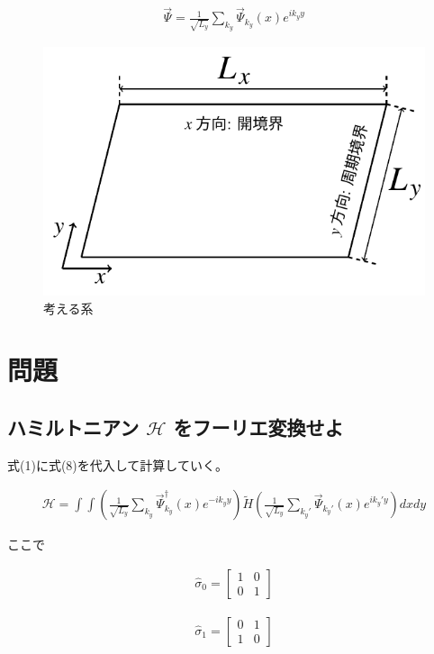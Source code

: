 \documentclass{jsarticle}
\begin{document}
		\begin{align}
			\vec{\Psi}=\frac{1}{\sqrt{L_y}}\sum_{k_y} \vec{\Psi}_{k_y}(x) e^{ik_yy}
		\end{align}

		\begin{figure}[H]
			\centering
			\includegraphics[scale=1]{figure1}
			\caption{考える系}
			\label{system}
		\end{figure}

	\section{問題}
		\subsection{ハミルトニアン $\mathcal{H}$ をフーリエ変換せよ}
		式(1)に式(8)を代入して計算していく。
		
		\begin{align}
			\mathcal{H}=\int \int \left( \frac{1}{\sqrt{L_y}}\sum_{k_y} \vec{\Psi}^\dagger _{k_y}(x) e^{-ik_yy} \right) \tilde{H} \left( \frac{1}{\sqrt{L_y}}\sum_{k_y'} \vec{\Psi}_{k_y'}(x) e^{ik_y'y} \right) dxdy
		\end{align}
		
		ここで
		
		\begin{align}
			\hat{\sigma}_0=
			\begin{bmatrix}
				1 & 0 \\ 
				0 & 1
			\end{bmatrix}
		\end{align}
		
		\begin{align}
			\hat{\sigma}_1=
			\begin{bmatrix}
				0 & 1 \\ 
				1 & 0
			\end{bmatrix}
		\end{align}
		
\end{document}
